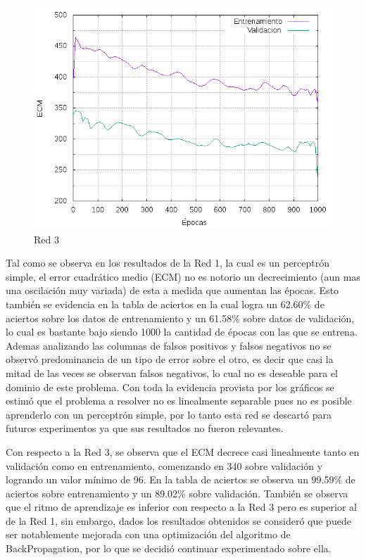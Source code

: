 \begin{figure}[H]
  \includegraphics[width=125mm]{imagenes/ej1/ex_1-1_red_11-6-6-9-1_errors.png}
  \caption{Red 3}
\end{figure}


 Tal como se observa en los resultados de la Red 1, la cual es un perceptrón simple, el error cuadrático medio (ECM) no es notorio un decrecimiento (aun mas una oscilación
 muy variada) de esta a medida que aumentan las épocas.
 Esto también se evidencia en la tabla de aciertos en la cual logra un 62.60\% de aciertos sobre los datos de entrenamiento y un 61.58\% sobre datos de validación,
 lo cual es bastante bajo siendo 1000 la cantidad de épocas con las que se entrena. Ademas analizando las columnas de falsos positivos y falsos negativos no se observó
 predominancia de un tipo de error sobre el otro, es decir que casi la mitad de las veces se observan falsos negativos, lo cual no es deseable para el dominio de este problema.
 Con toda la evidencia provista por los gráficos se estimó que el problema a resolver no es linealmente separable pues no es posible
 aprenderlo con un perceptrón simple, por lo tanto esta red se descartó para futuros experimentos ya que sus resultados no fueron relevantes.

 Con respecto a la Red 3, se observa que el ECM decrece casi linealmente tanto en validación como en entrenamiento, comenzando en 340 sobre validación y
 logrando un valor mínimo de 96. En la tabla de aciertos se observa un 99.59\% de aciertos sobre entrenamiento y un 89.02\% sobre validación. También se observa
 que el ritmo de aprendizaje es inferior con respecto a la Red 3 pero es superior al de la Red 1, sin embargo, dados los resultados obtenidos se consideró
 que puede ser notablemente mejorada con una optimización del algoritmo de BackPropagation, por lo que se decidió continuar experimentado sobre ella.

